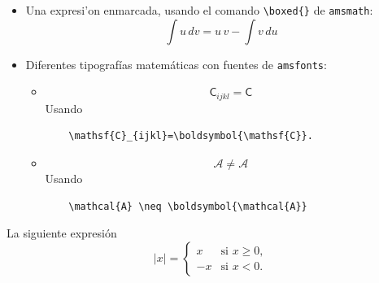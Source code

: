 \documentclass[11pt]{exam}
\begin{document}
\begin{questions}
\begin{itemize}
\begin{verbatim}

	\begin{align} 
	 ... &= ...\\
	 ... &= ...\\
	 ... &= ...
	\end{align} 
\end{verbatim}

\item Una expresi'on enmarcada, usando el comando \verb|\boxed{}| de \texttt{amsmath}:
\newline
\begin{equation*}
\boxed{\int u \, dv=u\,v-\int v \, du}
\end{equation*}

\item Diferentes tipografías matem\'aticas con fuentes de \texttt{amsfonts}:
\begin{itemize}
\item 
\begin{equation}
\mathsf{C}_{ijkl}=\boldsymbol{\mathsf{C}}
\end{equation}
Usando

\begin{verbatim}
	\mathsf{C}_{ijkl}=\boldsymbol{\mathsf{C}}.
\end{verbatim}

\item 
\begin{equation}
\mathcal{A} \neq \boldsymbol{\mathcal{A}}
\end{equation}
Usando

\begin{verbatim}
	\mathcal{A} \neq \boldsymbol{\mathcal{A}}
\end{verbatim}


\end{itemize}
\end{itemize}
\item La siguiente expresi\'on
\begin{equation}
 |x| = \left\{ \begin{array}{ll}
         x & \mbox{si $x \geq 0$},\\
        -x & \mbox{si $x < 0$}.\end{array} \right.
\end{equation}


\end{questions}
\end{document}
